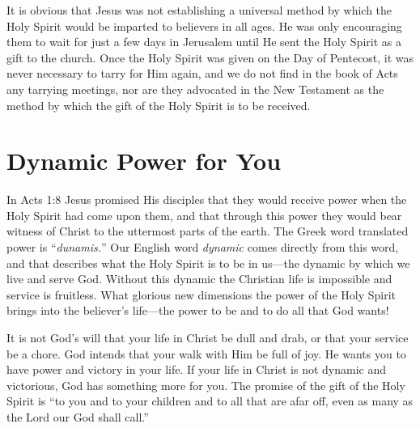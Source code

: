It is obvious that Jesus was not establishing a universal
method by which the Holy Spirit would be imparted to
believers in all ages. He was only encouraging them to wait
for just a few days in Jerusalem until He sent the Holy Spirit
as a gift to the church. Once the Holy Spirit was given on
the Day of Pentecost, it was never necessary to tarry for
Him again, and we do not find in the book of Acts any tarrying
meetings, nor are they advocated in the New Testament
as the method by which the gift of the Holy Spirit is to be
received.


\section*{Dynamic Power for You}

In Acts 1:8 Jesus promised His disciples that they would
receive power when the Holy Spirit had come upon them,
and that through this power they would bear witness of
Christ to the uttermost parts of the earth. The Greek word
translated power is “\emph{dunamis.}” Our English word \emph{dynamic}
comes directly from this word, and that describes what
the Holy Spirit is to be in us—the dynamic by which we
live and serve God. Without this dynamic the Christian life
is impossible and service is fruitless. What glorious new
dimensions the power of the Holy Spirit brings into the
believer’s life—the power to be and to do all that God
wants!

It is not God’s will that your life in Christ be dull and
drab, or that your service be a chore. God intends that your
walk with Him be full of joy. He wants you to have power
and victory in your life. If your life in Christ is not dynamic
and victorious, God has something more for you. The promise
of the gift of the Holy Spirit is “to you and to your children
and to all that are afar off, even as many as the Lord
our God shall call.”




